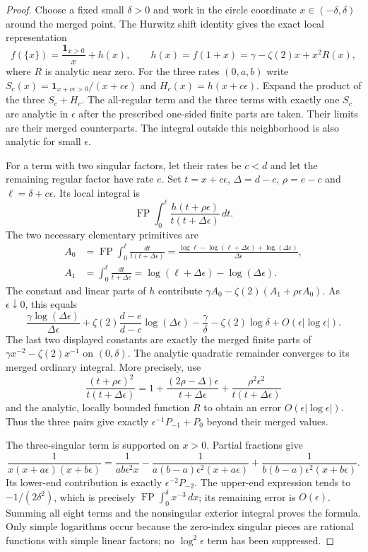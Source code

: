 \documentclass[11pt,a4paper]{article}
\numberwithin{equation}{section}
\theoremstyle{definition}
\theoremstyle{remark}
\begin{document}
\begin{proof}
Choose a fixed small $\delta>0$ and work in the circle coordinate
$x\in(-\delta,\delta)$ around the merged point. The Hurwitz shift
identity \cite[Equation~25.11.3]{DLMFHurwitz} gives the exact local representation
\[
 f(\{x\})=\frac{\mathbf 1_{x>0}}x+h(x),\qquad
 h(x)=f(1+x)=\gamma-\zeta(2)x+x^2R(x),
\]
where $R$ is analytic near zero. For the three rates $(0,a,b)$ write
$S_c(x)=\mathbf 1_{x+c\epsilon>0}/(x+c\epsilon)$ and
$H_c(x)=h(x+c\epsilon)$. Expand the product of the three $S_c+H_c$.
The all-regular term and the three terms with exactly one $S_c$ are
analytic in $\epsilon$ after the prescribed one-sided finite parts
are taken. Their limits are their merged counterparts. The integral
outside this neighborhood is also analytic for small $\epsilon$.

For a term with two singular factors, let their rates be $c<d$ and
let the remaining regular factor have rate $e$. Set
$t=x+c\epsilon$, $\Delta=d-c$, $\rho=e-c$ and $\ell=\delta+c\epsilon$.
Its local integral is
\[
 \operatorname{FP}\int_0^\ell
     \frac{h(t+\rho\epsilon)}{t(t+\Delta\epsilon)}\,dt.
\]
The two necessary elementary primitives are
\begin{align*}
 A_0&=\operatorname{FP}\int_0^\ell\frac{dt}{t(t+\Delta\epsilon)}
 =\frac{\log\ell-\log(\ell+\Delta\epsilon)
                  +\log(\Delta\epsilon)}{\Delta\epsilon},\\
 A_1&=\int_0^\ell\frac{dt}{t+\Delta\epsilon}
 =\log(\ell+\Delta\epsilon)-\log(\Delta\epsilon).
\end{align*}
The constant and linear parts of $h$ contribute
$\gamma A_0-\zeta(2)(A_1+\rho\epsilon A_0)$. As $\epsilon\downarrow0$,
this equals
\[
 \frac{\gamma\log(\Delta\epsilon)}{\Delta\epsilon}
 +\zeta(2)\frac{d-e}{d-c}\log(\Delta\epsilon)
 -\frac\gamma\delta-\zeta(2)\log\delta+O(\epsilon|\log\epsilon|).
\]
The last two displayed constants are exactly the merged finite parts
of $\gamma x^{-2}-\zeta(2)x^{-1}$ on $(0,\delta)$.
The analytic quadratic remainder converges to its merged ordinary
integral. More precisely, use
\[
 \frac{(t+\rho\epsilon)^2}{t(t+\Delta\epsilon)}
 =1+\frac{(2\rho-\Delta)\epsilon}{t+\Delta\epsilon}
       +\frac{\rho^2\epsilon^2}{t(t+\Delta\epsilon)}
\]
and the analytic, locally bounded function $R$ to obtain an error
$O(\epsilon|\log\epsilon|)$. Thus the three pairs give exactly
$\epsilon^{-1}P_{-1}+P_0$ beyond their merged values.

The three-singular term is supported on $x>0$. Partial fractions give
\[
 \frac1{x(x+a\epsilon)(x+b\epsilon)}
 =\frac1{ab\epsilon^2x}
  -\frac1{a(b-a)\epsilon^2(x+a\epsilon)}
  +\frac1{b(b-a)\epsilon^2(x+b\epsilon)}.
\]
Its lower-end contribution is exactly $\epsilon^{-2}P_{-2}$. The
upper-end expression tends to $-1/(2\delta^2)$, which is precisely
$\operatorname{FP}\int_0^\delta x^{-3}\,dx$; its remaining error is
$O(\epsilon)$. Summing all eight terms and the nonsingular exterior
integral proves the formula. Only simple logarithms occur because the
zero-index singular pieces are rational functions with simple linear
factors; no $\log^2\epsilon$ term has been suppressed.
\end{proof}
\end{document}
